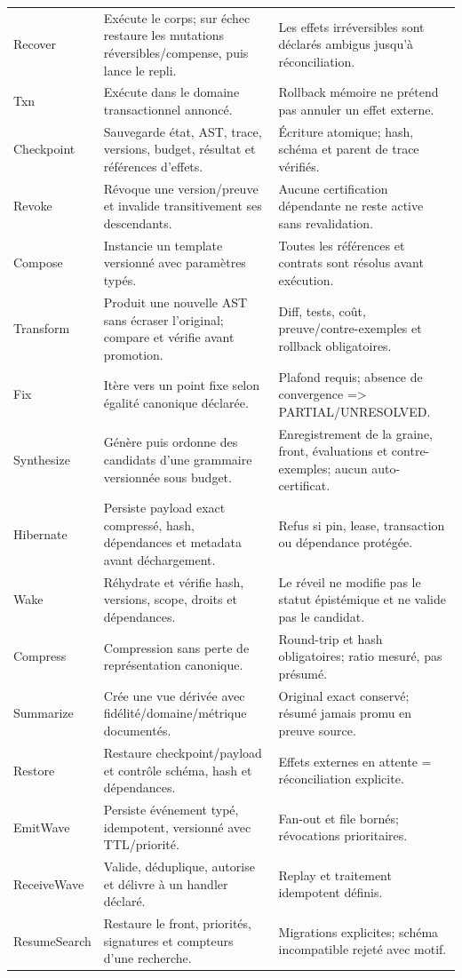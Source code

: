 \documentclass[10pt,a4paper]{article}
\begin{document}
\begin{longtable}{p{}p{}p{}}
Recover & Exécute le corps; sur échec restaure les mutations réversibles/compense, puis lance le repli. & Les effets irréversibles sont déclarés ambigus jusqu'à réconciliation. \\
Txn & Exécute dans le domaine transactionnel annoncé. & Rollback mémoire ne prétend pas annuler un effet externe. \\
Checkpoint & Sauvegarde état, AST, trace, versions, budget, résultat et références d'effets. & Écriture atomique; hash, schéma et parent de trace vérifiés. \\
Revoke & Révoque une version/preuve et invalide transitivement ses descendants. & Aucune certification dépendante ne reste active sans revalidation. \\
Compose & Instancie un template versionné avec paramètres typés. & Toutes les références et contrats sont résolus avant exécution. \\
Transform & Produit une nouvelle AST sans écraser l'original; compare et vérifie avant promotion. & Diff, tests, coût, preuve/contre-exemples et rollback obligatoires. \\
Fix & Itère vers un point fixe selon égalité canonique déclarée. & Plafond requis; absence de convergence => PARTIAL/UNRESOLVED. \\
Synthesize & Génère puis ordonne des candidats d'une grammaire versionnée sous budget. & Enregistrement de la graine, front, évaluations et contre-exemples; aucun auto-certificat. \\
Hibernate & Persiste payload exact compressé, hash, dépendances et metadata avant déchargement. & Refus si pin, lease, transaction ou dépendance protégée. \\
Wake & Réhydrate et vérifie hash, versions, scope, droits et dépendances. & Le réveil ne modifie pas le statut épistémique et ne valide pas le candidat. \\
Compress & Compression sans perte de représentation canonique. & Round-trip et hash obligatoires; ratio mesuré, pas présumé. \\
Summarize & Crée une vue dérivée avec fidélité/domaine/métrique documentés. & Original exact conservé; résumé jamais promu en preuve source. \\
Restore & Restaure checkpoint/payload et contrôle schéma, hash et dépendances. & Effets externes en attente = réconciliation explicite. \\
EmitWave & Persiste événement typé, idempotent, versionné avec TTL/priorité. & Fan-out et file bornés; révocations prioritaires. \\
ReceiveWave & Valide, déduplique, autorise et délivre à un handler déclaré. & Replay et traitement idempotent définis. \\
ResumeSearch & Restaure le front, priorités, signatures et compteurs d'une recherche. & Migrations explicites; schéma incompatible rejeté avec motif. \\
\bottomrule
\end{longtable}
\end{document}
